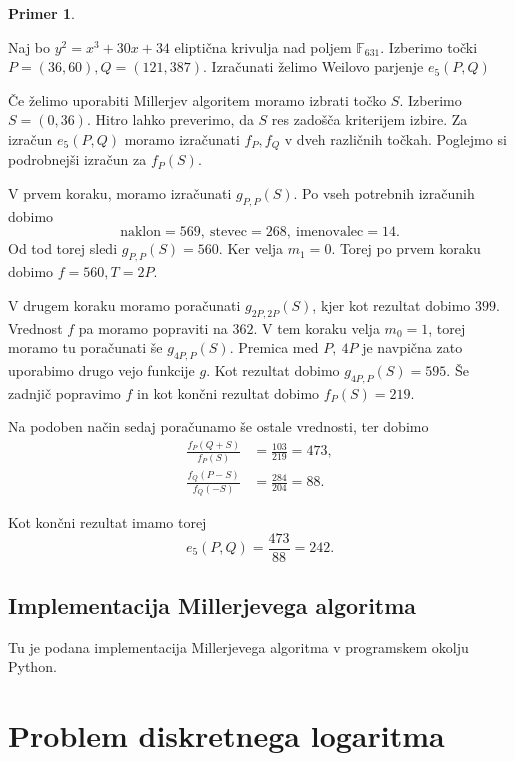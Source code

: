 \documentclass[12pt,a4paper,twoside]{article}
\theoremstyle{definition} %
\newtheorem{primer}[definicija]{Primer}
\theoremstyle{plain} %
\numberwithin{equation}{section}  %
\newcommand{\F}{\mathbb F}
\begin{document}
\begin{primer}~

Naj bo $y^2 = x^3+30x+34$ eliptična krivulja nad poljem $\F_{631}$. Izberimo točki $P = (36,60),Q = (121,387)$. Izračunati želimo Weilovo parjenje $e_5(P,Q)$

Če želimo uporabiti Millerjev algoritem moramo izbrati točko $S$. Izberimo $S=(0,36)$. Hitro lahko preverimo, da $S$ res zadošča kriterijem izbire.
Za izračun $e_5(P,Q)$ moramo izračunati $f_P,f_Q$ v dveh različnih točkah. Poglejmo si podrobnejši izračun za $f_P(S)$.

V prvem koraku, moramo izračunati $g_{P,P}(S)$. Po vseh potrebnih izračunih dobimo $$\text{naklon} = 569,\ \text{stevec} = 268,\ \text{imenovalec} = 14.$$ Od tod torej sledi $g_{P,P}(S) = 560$. Ker velja $m_1 = 0$. Torej po prvem koraku dobimo $f = 560, T = 2P$.

V drugem koraku moramo poračunati $g_{2P,2P}(S)$, kjer kot rezultat dobimo $399$. Vrednost $f$ pa moramo popraviti na $362$. V tem koraku velja $m_0 = 1$, torej moramo tu poračunati še
$g_{4P,P}(S)$. Premica med $P,\ 4P$ je navpična zato uporabimo drugo vejo funkcije $g$. Kot rezultat dobimo $g_{4P,P}(S) = 595$. Še zadnjič popravimo $f$ in kot končni rezultat dobimo
$f_P(S) = 219$.

Na podoben način sedaj poračunamo še ostale vrednosti, ter dobimo
\begin{align}
\frac{f_P(Q+S)}{f_P(S)} &{}= \frac{103}{219} = 473, \nonumber \\
\frac{f_Q(P-S)}{f_Q(-S)} &{}= \frac{284}{204} = 88. \nonumber
\end{align}

Kot končni rezultat imamo torej
$$e_5(P,Q) =\frac{473}{88} = 242.$$

\end{primer}

\subsection{Implementacija Millerjevega algoritma}
Tu je podana implementacija Millerjevega algoritma v programskem okolju Python.



\newpage

\section{Problem diskretnega logaritma}
\end{document}
